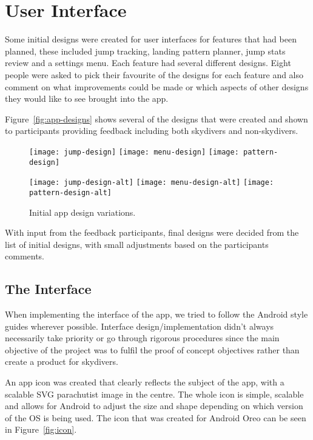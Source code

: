 \section{User Interface}\label{sec:user-interface}
Some initial designs were created for user interfaces for features that had been planned, these included jump tracking, landing pattern planner, jump stats review and a settings menu. Each feature had several different designs. Eight people were asked to pick their favourite of the designs for each feature and also comment on what improvements could be made or which aspects of other designs they would like to see brought into the app.

Figure~\vref{fig:app-designs} shows several of the designs that were created and shown to participants providing feedback including both skydivers and non-skydivers.

\begin{figure}[ht]
  \centering
  \texttt{[image: jump-design]}
  \hspace{1cm}
  \texttt{[image: menu-design]}
  \hspace{1cm}
  \texttt{[image: pattern-design]}

  \texttt{[image: jump-design-alt]}
  \hspace{1cm}
  \texttt{[image: menu-design-alt]}
  \hspace{1cm}
  \texttt{[image: pattern-design-alt]}
  \caption{Initial app design variations.}\label{fig:app-designs}
\end{figure}

With input from the feedback participants, final designs were decided from the list of initial designs, with small adjustments based on the participants comments.

\subsection{The Interface}
When implementing the interface of the app, we tried to follow the Android style guides wherever possible. Interface design/implementation didn't always necessarily take priority or go through rigorous procedures since the main objective of the project was to fulfil the proof of concept objectives rather than create a product for skydivers.

An app icon was created that clearly reflects the subject of the app, with a scalable SVG parachutist image in the centre. The whole icon is simple, scalable and allows for Android to adjust the size and shape depending on which version of the OS is being used. The icon that was created for Android Oreo can be seen in Figure~\vref{fig:icon}.

